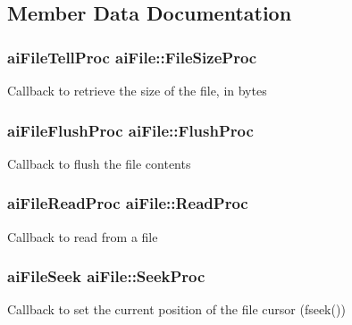 \subsection{Member Data Documentation}
\subsubsection[{\texorpdfstring{File\+Size\+Proc}{FileSizeProc}}]{\setlength{\rightskip}{0pt plus 5cm}ai\+File\+Tell\+Proc ai\+File\+::\+File\+Size\+Proc}\hypertarget{structai_file_aff2fff8c0458e7ec71f7de217c3a3033}{}\label{structai_file_aff2fff8c0458e7ec71f7de217c3a3033}
Callback to retrieve the size of the file, in bytes 
\subsubsection[{\texorpdfstring{Flush\+Proc}{FlushProc}}]{\setlength{\rightskip}{0pt plus 5cm}ai\+File\+Flush\+Proc ai\+File\+::\+Flush\+Proc}\hypertarget{structai_file_a1102d28d1c0be68ffed20476669bdb0d}{}\label{structai_file_a1102d28d1c0be68ffed20476669bdb0d}
Callback to flush the file contents 
\subsubsection[{\texorpdfstring{Read\+Proc}{ReadProc}}]{\setlength{\rightskip}{0pt plus 5cm}ai\+File\+Read\+Proc ai\+File\+::\+Read\+Proc}\hypertarget{structai_file_a52287e81ca67b9d43cc1ce6142f781fa}{}\label{structai_file_a52287e81ca67b9d43cc1ce6142f781fa}
Callback to read from a file 
\subsubsection[{\texorpdfstring{Seek\+Proc}{SeekProc}}]{\setlength{\rightskip}{0pt plus 5cm}ai\+File\+Seek ai\+File\+::\+Seek\+Proc}\hypertarget{structai_file_a7a07b499be4ad433669246479a4d4ad2}{}\label{structai_file_a7a07b499be4ad433669246479a4d4ad2}
Callback to set the current position of the file cursor (fseek()) 
